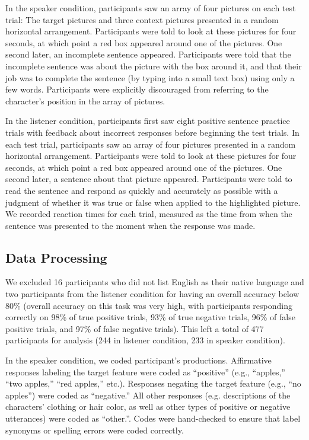 \documentclass[man, noapacite]{apa2}
\begin{document}
In the speaker condition, participants saw an array of four pictures on each test trial: The target pictures and three context pictures presented in a random horizontal arrangement.  Participants were told to look at these pictures for four seconds, at which point a red box appeared around one of the pictures.  One second later, an incomplete sentence appeared.  Participants were told that the incomplete sentence was about the picture with the box around it, and that their job was to complete the sentence (by typing into a small text box) using only a few words. Participants were explicitly discouraged from referring to the character's position in the array of pictures.

In the listener condition, participants first saw eight positive sentence practice trials with feedback about incorrect responses before beginning the test trials. In each test trial, participants saw an array of four pictures presented in a random horizontal arrangement.  Participants were told to look at these pictures for four seconds, at which point a red box appeared around one of the pictures.  One second later, a sentence about that picture appeared.  Participants were told to read the sentence and respond as quickly and accurately as possible with a judgment of whether it was true or false when applied to the highlighted picture.  We recorded reaction times for each trial, measured as the time from when the sentence was presented to the moment when the response was made.

\subsection{Data Processing}

We excluded 16 participants who did not list English as their native language and two participants from the listener condition for having an overall accuracy below 80\% (overall accuracy on this task was very high, with participants responding correctly on 98\% of true positive trials, 93\% of true negative trials, 96\% of false positive trials, and 97\% of false negative trials). This left a total of 477 participants for analysis (244 in listener condition, 233 in speaker condition).

In the speaker condition, we coded participant's productions. Affirmative responses labeling the target feature were coded as ``positive'' (e.g., ``apples,'' ``two apples,'' ``red apples,'' etc.).  Responses negating the target feature (e.g., ``no apples'') were coded as ``negative.''  All other responses (e.g. descriptions of the characters' clothing or hair color, as well as other types of positive or negative utterances) were coded as ``other.''.   Codes were hand-checked to ensure that label synonyms or spelling errors were coded correctly.
\end{document}
